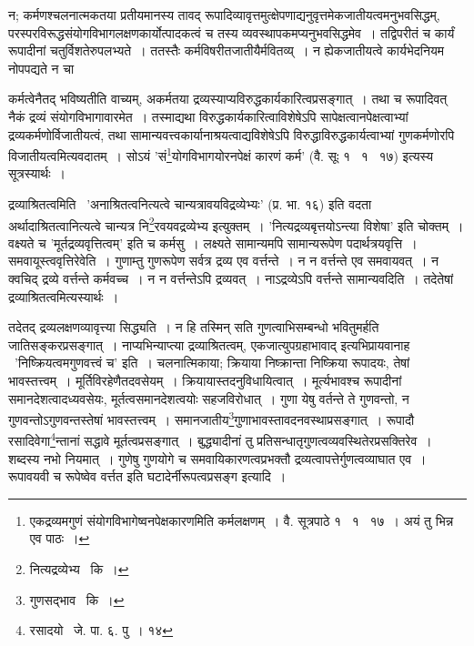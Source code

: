 \documentclass[11pt, openany]{book}
\begin{document}
{न; कर्मणश्चलनात्मकतया प्रतीयमानस्य तावद् रूपादिव्यावृत्तमुत्क्षेपणाद्यनुवृत्तमेकजातीयत्वमनुभवसिद्धम्, परस्परविरूद्धसंयोगविभागलक्षणकार्योत्पादकत्वं च तस्य व्यवस्थापकमप्यनुभवसिद्धमेव~। तद्विपरीतं च कार्यं रूपादीनां चतुर्विशतेरुपलभ्यते~। ततस्तैः कर्मविषरीतजातीयैर्मवितव्य्~। न ह्येकजातीयत्वे कार्यभेदनियम नोपपद्यते न चा

\newpage
\noindent
कर्मत्वेनैतद् भविष्यतीति वाच्यम्, अकर्मतया द्रव्यस्याप्यविरुद्धकार्यकारित्वप्रसङ्गात्~। तथा च रूपादिवत् नैकं द्रव्यं संयोगविभागावारमेत~। तस्माद्यथा विरुद्धकार्यकारित्वाविशेषेऽपि सापेक्षत्वानपेक्षत्वाभ्यां द्रव्यकर्मणोर्विजातीयत्वं, तथा सामान्यवत्त्वकार्यानाश्रयत्वाद्यविशेषेऽपि विरुद्धाविरुद्धकार्यत्वाभ्यां गुणकर्मणोरपि विजातीयत्वमित्यवदातम्~। सोऽयं 'सं\renewcommand{\thefootnote}{1}\footnote{एकद्रव्यमगुणं संयोगविभागेष्वनपेक्षकारणमिति कर्मलक्षणम्~। वै. सूत्रपाठे १ \textendash\ १ \textendash\ १७~। अयं तु भिन्न एव पाठः~।}योगविभागयोरनपेक्षं कारणं कर्म' (वै. सूः १ \textendash\ १ \textendash\ १७) इत्यस्य सूत्रस्यार्थः~। 

{\knu द्रव्याश्रितत्वमिति} \textendash\ 'अनाश्रितत्वनित्यत्वे चान्यत्रावयविद्रव्येभ्यः' (प्र. भा. १६) इति वदता अर्थादाश्रितत्वानित्यत्वे चान्यत्र नि\renewcommand{\thefootnote}{2}\footnote{नित्यद्रव्येभ्य \textendash\ कि~।}रवयवद्रव्येभ्य इत्युक्तम्~। {\knu 'नित्यद्रव्यबृत्तयोऽन्त्या विशेषा'} इति चोक्तम्~। वक्ष्यते च {\knu 'मूर्तद्रव्यवृत्तित्वम्'} इति च कर्मसु~। लक्ष्यते सामान्यमपि सामान्यरूपेण पदार्थत्रयवृत्ति~। समवायूस्त्ववृत्तिरेवेति~। गुणाम्तु गुणरूपेण सर्वत्र द्रव्य एव वर्त्तन्ते~। न न वर्त्तन्ते एव समवायवत्~। न क्वचिद् द्रव्ये वर्त्तन्ते कर्मवच्च~। न न वर्त्तन्तेऽपि द्रव्यवत्~। नाऽद्रव्येऽपि वर्त्तन्ते सामान्यवदिति~। तदेतेषां द्रव्याश्रितत्वमित्यस्यार्थः~।

तदेतद् द्रव्यलक्षणव्यावृत्त्या सिद्ध्यति~। न हि तस्मिन् सति गुणत्वाभिसम्बन्धो भवितुमर्हति जातिसङ्करप्रसङ्गात्~। नाप्यभिन्याप्त्या द्रव्याश्रितत्वम्, एकजात्युपग्रहाभावाद् इत्यभिप्रायवानाह \textendash\ {\knu 'निष्क्रियत्वमगुणवत्त्वं च'} इति~। चलनात्मिकाया; क्रियाया निष्क्रान्ता निष्क्रिया रूपादयः, तेषां भावस्तत्त्वम्~। मूर्तिविरहेणैतदवसेयम्~। क्रियायास्तदनुविधायित्वात्~। मूर्त्यभावश्च रूपादीनां समानदेशत्वादध्यवसेयः, मूर्तत्वसमानदेशत्वयोः सहजविरोधात्~। गुणा येषु वर्तन्ते ते गुणवन्तो, न गुणवन्तोऽगुणवन्तस्तेषां भावस्तत्त्वम्~। समानजातीय\renewcommand{\thefootnote}{3}\footnote{गुणसद्भाव \textendash\ कि~।}गुणाभावस्तावदनवस्थाप्रसङ्गात्~। रूपादौ रसादिवेगा\renewcommand{\thefootnote}{4}\footnote{रसादयो \textendash\ जे. पा. ६. पु~। १४}न्तानां सद्धावे मूर्तत्वप्रसङ्गात्~। बुद्ध्यादीनां तु प्रतिसन्धातृगुणत्वव्यवस्थितेरप्रसक्तिरेव~। शब्दस्य नभो नियमात्~। गुणेषु गुणयोगे च समवायिकारणत्वप्रभक्तौ द्रव्यत्वापत्तेर्गुणत्वव्याघात एव~। रूपावयवी च रूपेष्वेव वर्त्तत इति घटादेर्नीरूपत्वप्रसङ्ग इत्यादि~।

}
\end{document}
